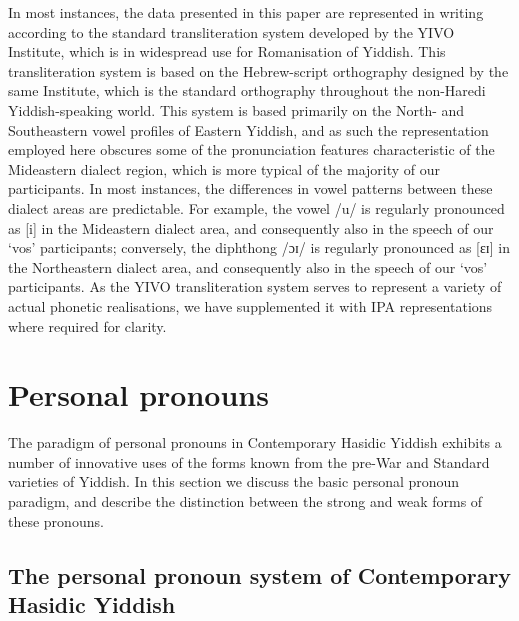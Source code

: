 \documentclass[output=paper, hidelinks]{langscibook}
\begin{document}
In most instances, the data presented in this paper are represented in writing according to the standard transliteration system developed by the YIVO Institute, which is in widespread use for Romanisation of Yiddish. This transliteration system is based on the Hebrew-script orthography designed by the same Institute, which is the standard orthography throughout the non-Haredi Yiddish-speaking world. This system is based primarily on the North- and Southeastern vowel profiles of Eastern Yiddish, and as such the representation employed here obscures some of the pronunciation features characteristic of the Mideastern dialect region, which is more typical of the majority of our participants. In most instances, the differences in vowel patterns between these dialect areas are predictable. For example, the vowel /u/ is regularly pronounced as [i] in the Mideastern dialect area, and consequently also in the speech of our ‘vos’ participants; conversely, the diphthong /ɔɪ/ is regularly pronounced as [ɛɪ] in the Northeastern dialect area, and consequently also in the speech of our ‘vos’ participants. As the YIVO transliteration system serves to represent a variety of actual phonetic realisations, we have supplemented it with IPA representations where required for clarity. 


\section{Personal pronouns}\label{sec:personalpronouns}
\sloppy
The paradigm of personal pronouns in Contemporary Hasidic Yiddish exhibits a number of innovative uses of the forms known from the pre-War and Standard varieties of Yiddish. In this section we discuss the basic personal pronoun paradigm, and describe the distinction between the strong and weak forms of these pronouns.
\fussy

\subsection{The personal pronoun system of Contemporary Hasidic Yiddish}
\end{document}
